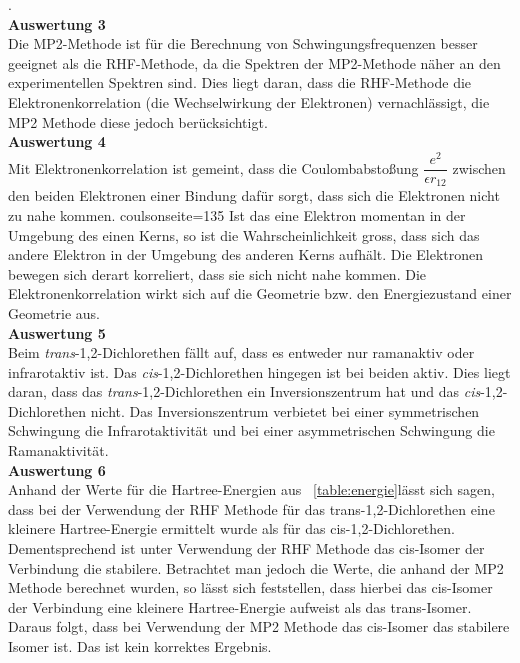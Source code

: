 \documentclass[12pt]{article}
\begin{document}
\begin{onehalfspace}
.\\
\textbf{Auswertung 3}\\
Die MP2-Methode ist für die Berechnung von Schwingungsfrequenzen besser geeignet als die RHF-Methode,
da die Spektren der MP2-Methode näher an den experimentellen Spektren sind.
Dies liegt daran, dass die RHF-Methode die Elektronenkorrelation (die Wechselwirkung der Elektronen) vernachlässigt,
die MP2 Methode diese jedoch berücksichtigt.\\
\textbf{Auswertung 4}\\
Mit Elektronenkorrelation ist gemeint, dass die Coulombabstoßung $\dfrac{e^2}{\epsilon r_{12}}$ zwischen den beiden Elektronen einer Bindung dafür sorgt, dass sich
die Elektronen nicht zu nahe kommen. coulsonseite=135 Ist das eine Elektron momentan in der Umgebung des einen Kerns,
so ist die Wahrscheinlichkeit gross, dass sich das andere Elektron in der Umgebung des anderen Kerns aufhält. Die Elektronen bewegen sich derart \glqq
korreliert\grqq, dass sie sich nicht nahe kommen. Die Elektronenkorrelation wirkt sich auf die Geometrie bzw. den
Energiezustand einer Geometrie aus.\\
\textbf{Auswertung 5}\\
Beim \textit{trans}-1,2-Dichlorethen fällt auf, dass es entweder nur ramanaktiv oder infrarotaktiv ist.
Das \textit{cis}-1,2-Dichlorethen hingegen
 ist bei beiden aktiv. Dies liegt daran, dass das \textit{trans}-1,2-Dichlorethen ein
  Inversionszentrum hat und das \textit{cis}-1,2-Dichlorethen nicht.
Das Inversionszentrum verbietet bei einer symmetrischen Schwingung die
Infrarotaktivität und bei einer asymmetrischen Schwingung die Ramanaktivität.\\
\textbf{Auswertung 6}\\

Anhand der Werte für die Hartree-Energien aus ~\ref{table:energie}lässt sich sagen, dass
bei der Verwendung der RHF Methode für das {trans}-1,2-Dichlorethen eine
kleinere Hartree-Energie ermittelt wurde als für das cis-1,2-Dichlorethen.
Dementsprechend ist unter Verwendung der RHF Methode das cis-Isomer der
Verbindung die stabilere. Betrachtet man jedoch die Werte, die anhand der MP2
Methode berechnet wurden, so lässt sich feststellen, dass hierbei das cis-Isomer
der Verbindung eine kleinere Hartree-Energie aufweist als das trans-Isomer.
Daraus folgt, dass bei Verwendung der MP2 Methode das cis-Isomer das
stabilere Isomer ist. Das ist kein korrektes Ergebnis.

\end{onehalfspace}
\end{document}
